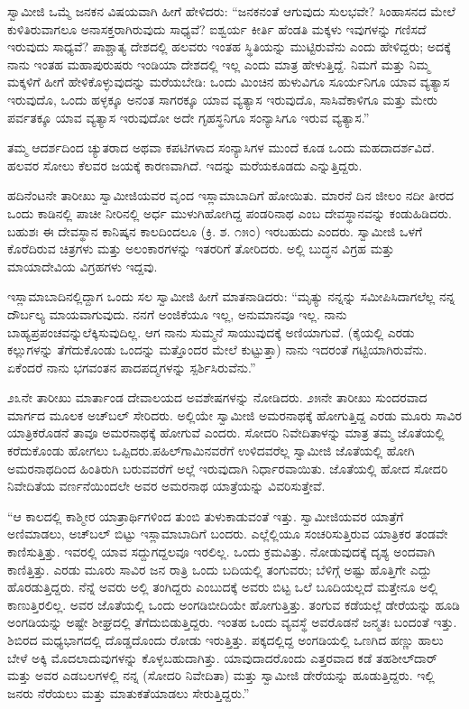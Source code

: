  ಸ್ವಾಮೀಜಿ ಒಮ್ಮೆ ಜನಕನ ವಿಷಯವಾಗಿ ಹೀಗೆ ಹೇಳಿದರು: “ಜನಕನಂತೆ ಆಗುವುದು ಸುಲಭವೇ? ಸಿಂಹಾಸನದ ಮೇಲೆ ಕುಳಿತಿರುವಾಗಲೂ ಅನಾಸಕ್ತರಾಗಿರುವುದು ಸಾಧ್ಯವೆ? ಐಶ್ವರ್ಯ ಕೀರ್ತಿ ಹೆಂಡತಿ ಮಕ್ಕಳು ಇವುಗಳನ್ನು ಗಣಿಸದೆ ಇರುವುದು ಸಾಧ್ಯವೆ? ಪಾಶ್ಚಾತ್ಯ ದೇಶದಲ್ಲಿ ಹಲವರು ಇಂತಹ ಸ್ಥಿತಿಯನ್ನು ಮುಟ್ಟಿರುವೆನು ಎಂದು ಹೇಳಿದ್ದರು; ಅದಕ್ಕೆ ನಾನು ಇಂತಹ ಮಹಾಪುರುಷರು ಇಂಡಿಯಾ ದೇಶದಲ್ಲಿ ಇಲ್ಲ ಎಂದು ಮಾತ್ರ ಹೇಳುತ್ತಿದ್ದೆ. ನಿಮಗೆ ಮತ್ತು ನಿಮ್ಮ ಮಕ್ಕಳಿಗೆ ಹೀಗೆ ಹೇಳಿಕೊಳ್ಳುವುದನ್ನು ಮರೆಯಬೇಡಿ: ಒಂದು ಮಿಂಚಿನ ಹುಳುವಿಗೂ ಸೂರ್ಯನಿಗೂ ಯಾವ ವ್ಯತ್ಯಾಸ ಇರುವುದೊ, ಒಂದು ಹಳ್ಳಕ್ಕೂ ಅನಂತ ಸಾಗರಕ್ಕೂ ಯಾವ ವ್ಯತ್ಯಾಸ ಇರುವುದೊ, ಸಾಸಿವೆಕಾಳಿಗೂ ಮತ್ತು ಮೇರು ಪರ್ವತಕ್ಕೂ ಯಾವ ವ್ಯತ್ಯಾಸ ಇರುವುದೋ ಅದೇ ಗೃಹಸ್ಥನಿಗೂ ಸಂನ್ಯಾಸಿಗೂ ಇರುವ ವ್ಯತ್ಯಾಸ.”‌ 

 ತಮ್ಮ ಆದರ್ಶದಿಂದ ಚ್ಯುತರಾದ ಅಥವಾ ಕಪಟಿಗಳಾದ ಸಂನ್ಯಾಸಿಗಳ ಮುಂದೆ ಕೂಡ ಒಂದು ಮಹದಾದರ್ಶವಿದೆ. ಹಲವರ ಸೋಲು ಕೆಲವರ ಜಯಕ್ಕೆ ಕಾರಣವಾಗಿದೆ. ಇದನ್ನು ಮರೆಯಕೂಡದು ಎನ್ನುತ್ತಿದ್ದರು. 

 ಹದಿನೆಂಟನೇ ತಾರೀಖು ಸ್ವಾಮೀಜಿಯವರ ವೃಂದ ಇಸ್ಲಾಮಾಬಾದಿಗೆ ಹೋಯಿತು. ಮಾರನೆ ದಿನ ಜೀಲಂ ನದೀ ತೀರದ ಒಂದು ಕಾಡಿನಲ್ಲಿ ಪಾಚೀ ನೀರಿನಲ್ಲಿ ಅರ್ಧ ಮುಳುಗಿಹೋಗಿದ್ದ ಪಂಡರಿನಾಥ ಎಂಬ ದೇವಸ್ಥಾನವನ್ನು ಕಂಡುಹಿಡಿದರು. ಬಹುಶಃ ಈ ದೇವಸ್ಥಾನ ಕಾನಿಷ್ಕನ ಕಾಲದಿಂದಲೂ (ಕ್ರಿ. ಶ. ೧೫೦) ಇರಬಹುದು ಎಂದರು. ಸ್ವಾಮೀಜಿ ಒಳಗೆ ಕೊರೆದಿರುವ ಚಿತ್ರಗಳು ಮತ್ತು ಅಲಂಕಾರಗಳನ್ನು ಇತರರಿಗೆ ತೋರಿದರು. ಅಲ್ಲಿ ಬುದ್ಧನ ವಿಗ್ರಹ ಮತ್ತು ಮಾಯಾದೇವಿಯ ವಿಗ್ರಹಗಳು ಇದ್ದವು. 

 ಇಸ್ಲಾಮಾಬಾದಿನಲ್ಲಿದ್ದಾಗ ಒಂದು ಸಲ ಸ್ವಾಮೀಜಿ ಹೀಗೆ ಮಾತನಾಡಿದರು: “ಮೃತ್ಯು ನನ್ನನ್ನು ಸಮೀಪಿಸಿದಾಗಲೆಲ್ಲ ನನ್ನ ದೌರ್ಬಲ್ಯ ಮಾಯವಾಗುವುದು. ನನಗೆ ಅಂಜಿಕೆಯೂ ಇಲ್ಲ, ಅನುಮಾನವೂ‌ ಇಲ್ಲ. ನಾನು ಬಾಹ್ಯಪ್ರಪಂಚವನ್ನು\break ಲೆಕ್ಕಿಸುವುದಿಲ್ಲ. ಆಗ ನಾನು ಸುಮ್ಮನೆ ಸಾಯುವುದಕ್ಕೆ ಅಣಿಯಾಗುವೆ. (ಕೈಯಲ್ಲಿ ಎರಡು ಕಲ್ಲುಗಳನ್ನು ತೆಗೆದುಕೊಂಡು ಒಂದನ್ನು ಮತ್ತೊಂದರ ಮೇಲೆ ಕುಟ್ಟುತ್ತಾ) ನಾನು ಇದರಂತೆ ಗಟ್ಟಿಯಾಗಿರುವೆನು. ಏಕೆಂದರೆ ನಾನು ಭಗವಂತನ ಪಾದಪದ್ಮಗಳನ್ನು ಸ್ಪರ್ಶಿಸಿರುವೆನು.” 

 ೨೩ನೇ ತಾರೀಖು ಮಾರ್ತಾಂಡ ದೇವಾಲಯದ ಅವಶೇಷಗಳನ್ನು ನೋಡಿದರು. ೨೫ನೇ ತಾರೀಖು ಸುಂದರವಾದ ಮಾರ್ಗದ ಮೂಲಕ ಅಚ್‍ಬಲ್ ಸೇರಿದರು. ಅಲ್ಲಿಯೇ ಸ್ವಾಮೀಜಿ ಅಮರನಾಥಕ್ಕೆ ಹೋಗುತ್ತಿದ್ದ ಎರಡು ಮೂರು ಸಾವಿರ ಯಾತ್ರಿಕರೊಡನೆ ತಾವೂ ಅಮರನಾಥಕ್ಕೆ ಹೋಗುವೆ ಎಂದರು. ಸೋದರಿ ನಿವೇದಿತಾಳನ್ನು ಮಾತ್ರ ತಮ್ಮ ಜೊತೆಯಲ್ಲಿ ಕರೆದುಕೊಂಡು ಹೋಗಲು ಒಪ್ಪಿದರು.\break ಪಹಿಲ್‍ಗಾಮಿನವರೆಗೆ ಉಳಿದವರೆಲ್ಲ ಸ್ವಾಮೀಜಿ ಜೊತೆಯಲ್ಲಿ ಹೋಗಿ ಅಮರನಾಥದಿಂದ ಹಿಂತಿರುಗಿ ಬರುವವರೆಗೆ ಅಲ್ಲೆ ಇರುವುದಾಗಿ ನಿರ್ಧಾರವಾಯಿತು. ಜೊತೆಯಲ್ಲಿ ಹೋದ ಸೋದರಿ ನಿವೇದಿತೆಯ ವರ್ಣನೆಯಿಂದಲೇ ಅವರ ಅಮರನಾಥ ಯಾತ್ರೆಯನ್ನು ವಿವರಿಸುತ್ತೇವೆ. 

 “ಆ ಕಾಲದಲ್ಲಿ ಕಾಶ್ಮೀರ ಯಾತ್ರಾರ್ಥಿಗಳಿಂದ ತುಂಬಿ ತುಳುಕಾಡುವಂತೆ ಇತ್ತು. ಸ್ವಾಮೀಜಿಯವರ ಯಾತ್ರೆಗೆ ಅಣಿಮಾಡಲು, ಅಚ್‍ಬಲ್ ಬಿಟ್ಟು ಇಸ್ಲಾಮಾಬಾದಿಗೆ ಬಂದರು. ಎಲ್ಲೆಲ್ಲಿಯೂ ಸಂಚರಿಸುತ್ತಿರುವ ಯಾತ್ರಿಕರ ತಂಡವೇ ಕಾಣಿಸುತ್ತಿತ್ತು. ಇವರಲ್ಲಿ ಯಾವ ಸದ್ದುಗದ್ದಲವೂ ಇರಲಿಲ್ಲ. ಒಂದು ಕ್ರಮವಿತ್ತು. ನೋಡುವುದಕ್ಕೆ ದೃಶ್ಯ ಅಂದವಾಗಿ ಕಾಣಿತ್ತಿತ್ತು. ಎರಡು ಮೂರು ಸಾವಿರ ಜನ ರಾತ್ರಿ ಒಂದು ಬದಿಯಲ್ಲಿ ತಂಗುವರು; ಬೆಳಿಗ್ಗೆ ಅಷ್ಟು ಹೊತ್ತಿಗೇ ಎದ್ದು ಹೊರಡುತ್ತಿದ್ದರು. ನೆನ್ನೆ ಅವರು ಅಲ್ಲಿ ತಂಗಿದ್ದರು ಎಂಬುದಕ್ಕೆ ಅವರು ಬಿಟ್ಟ ಒಲೆ ಬೂದಿಯಲ್ಲದೆ ಮತ್ತೇನೂ ಅಲ್ಲಿ ಕಾಣುತ್ತಿರಲಿಲ್ಲ. ಅವರ ಜೊತೆಯಲ್ಲಿ ಒಂದು ಅಂಗಡಿಬೀದಿಯೇ ಹೋಗುತ್ತಿತ್ತು. ತಂಗುವ ಕಡೆಯಲ್ಲೆ ಡೇರೆಯನ್ನು ಹೂಡಿ ಅಂಗಡಿಯನ್ನು ಅಷ್ಟೇ ಶೀಘ್ರದಲ್ಲಿ ತೆಗೆದುಬಿಡುತ್ತಿದ್ದರು. ಇಂತಹ ಒಂದು ವ್ಯವಸ್ಥೆ ಅವರೊಡನೆ ಜನ್ಮತಃ ಬಂದಂತೆ ಇತ್ತು. ಶಿಬಿರದ ಮಧ್ಯಭಾಗದಲ್ಲಿ ದೊಡ್ಡದೊಂದು ರೋಡು ಇರುತ್ತಿತ್ತು. ಪಕ್ಕದಲ್ಲಿದ್ದ ಅಂಗಡಿಯಲ್ಲಿ ಒಣಗಿದ ಹಣ್ಣು ಹಾಲು ಬೇಳೆ ಅಕ್ಕಿ ಮೊದಲಾದುವುಗಳನ್ನು ಕೊಳ್ಳಬಹುದಾಗಿತ್ತು. ಯಾವುದಾದರೊಂದು ಎತ್ತರವಾದ ಕಡೆ ತಹಶೀಲ್‍ದಾರ್ ಮತ್ತು ಅವರ ಎಡಬಲಗಳಲ್ಲಿ ನನ್ನ (ಸೋದರಿ ನಿವೇದಿತಾ) ಮತ್ತು ಸ್ವಾಮೀಜಿ ಡೇರೆಯನ್ನು ಹೂಡುತ್ತಿದ್ದರು. ಇಲ್ಲಿ ಜನರು ನೆರೆಯಲು ಮತ್ತು ಮಾತುಕತೆಯಾಡಲು ಸೇರುತ್ತಿದ್ದರು.” 

